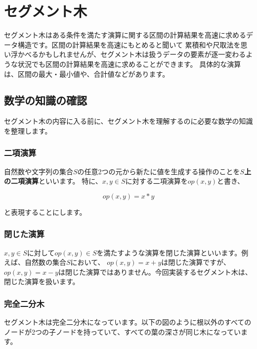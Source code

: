 \documentclass{jlreq}
\begin{document}
\newpage

\section{セグメント木}
セグメント木はある条件を満たす演算に関する区間の計算結果を高速に求めるデータ構造です。区間の計算結果を高速にもとめると聞いて
累積和や尺取法を思い浮かべるかもしれませんが、セグメント木は扱うデータの要素が逐一変わるような状況でも区間の計算結果を高速に求めることができます。
具体的な演算は、区間の最大・最小値や、合計値などがあります。

\subsection{数学の知識の確認}
セグメント木の内容に入る前に、セグメント木を理解するのに必要な数学の知識を整理します。

\subsubsection{二項演算}

自然数や文字列の集合$S$の任意2つの元から新たに値を生成する操作のことを\textbf{$S$上の二項演算}といいます。
特に、$x, y \in S$に対する二項演算を$op(x, y)$と書き、

\begin{equation*}
	op(x, y) = x * y
\end{equation*}

と表現することにします。

\subsubsection{閉じた演算}
$x, y \in S$に対して$op(x, y) \in S$を満たすような演算を閉じた演算といいます。例えば、自然数の集合$S$において、
$op(x, y) = x + y$は閉じた演算ですが、$op(x, y) = x - y$は閉じた演算ではありません。今回実装するセグメント木は、閉じた演算を扱います。

\subsubsection{完全二分木}
セグメント木は完全二分木になっています。以下の図のように根以外のすべてのノードが2つの子ノードを持っていて、すべての葉の深さが同じ木になっています。

\vspace{0.25cm}
\end{document}
